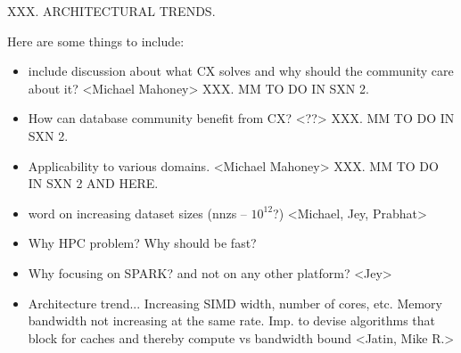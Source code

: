 XXX.  ARCHITECTURAL TRENDS.


Here are some things to include:
\begin{itemize}

\item include discussion about what CX solves and why should the community care about it? <Michael Mahoney>  XXX.  MM TO DO IN SXN 2.

\item How can database community benefit from CX? <??>  XXX.  MM TO DO IN SXN 2.

\item Applicability to various domains. <Michael Mahoney>  XXX.  MM TO DO IN SXN 2 AND HERE.

\item word on increasing dataset sizes (nnzs -- $10^{12}$?)  <Michael, Jey, Prabhat>

 \item Why HPC problem? Why should be fast?

\item Why focusing on SPARK? and not on any other platform? <Jey>

\item Architecture trend... Increasing SIMD width, number of cores, etc. Memory bandwidth not increasing at the same rate. Imp. to devise algorithms that block for caches and thereby compute vs bandwidth bound <Jatin, Mike R.>
    
\end{itemize}




